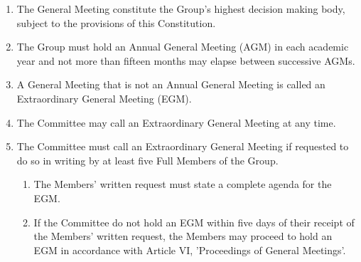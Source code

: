 \documentclass[12pt]{constitution}
\begin{document}

\begin{enumerate}
    \item The General Meeting constitute the Group's highest decision ­making body, subject to the provisions of this Constitution.
    \item The Group must hold an Annual General Meeting (AGM) in each academic year and not more than fifteen months may elapse between successive AGMs.
    \item A General Meeting that is not an Annual General Meeting is called an Extraordinary General Meeting (EGM).
    \item The Committee may call an Extraordinary General Meeting at any time.
    \item The Committee must call an Extraordinary General Meeting if requested to do so in writing by at least five Full Members of the Group.
    \begin{enumerate}
        \item The Members' written request must state a complete agenda for the EGM.
        \item If the Committee do not hold an EGM within five days of their receipt of the Members' written request, the Members may proceed to hold an EGM in accordance with Article VI, 'Proceedings of General Meetings'.
    \end{enumerate}
\end{enumerate}


\end{document}
